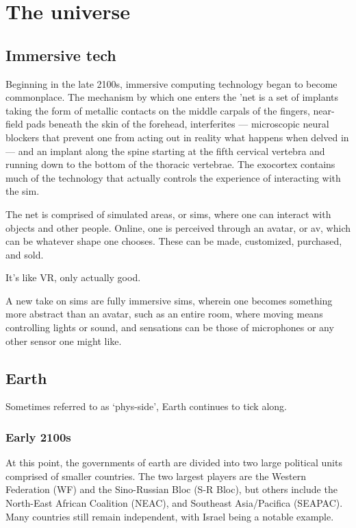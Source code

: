 \section*{The universe}

\subsection{Immersive tech}

Beginning in the late 2100s, immersive computing technology began to become commonplace. The mechanism by which one enters the 'net is a set of implants taking the form of metallic contacts on the middle carpals of the fingers, near-field pads beneath the skin of the forehead, interferites --- microscopic neural blockers that prevent one from acting out in reality what happens when delved in --- and an implant along the spine starting at the fifth cervical vertebra and running down to the bottom of the thoracic vertebrae. The exocortex contains much of the technology that actually controls the experience of interacting with the sim.

The net is comprised of simulated areas, or sims, where one can interact with objects and other people. Online, one is perceived through an avatar, or av, which can be whatever shape one chooses. These can be made, customized, purchased, and sold.

It's like VR, only actually good.

A new take on sims are fully immersive sims, wherein one becomes something more abstract than an avatar, such as an entire room, where moving means controlling lights or sound, and sensations can be those of microphones or any other sensor one might like.

\subsection{Earth}

Sometimes referred to as `phys-side', Earth continues to tick along.

\subsubsection{Early 2100s}

At this point, the governments of earth are divided into two large political units comprised of smaller countries. The two largest players are the Western Federation (WF) and the Sino-Russian Bloc (S-R Bloc), but others include the North-East African Coalition (NEAC), and Southeast Asia/Pacifica (SEAPAC). Many countries still remain independent, with Israel being a notable example.

